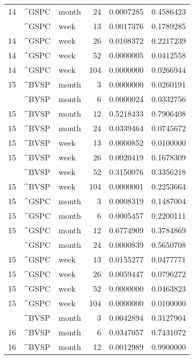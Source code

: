 \begin{tabular}{rllrrr}
14 & \textasciicircum{}GSPC & month & 24 & 0.0007285 & 0.4586423\\
\addlinespace
14 & \textasciicircum{}GSPC & week & 13 & 0.0017376 & 0.1789285\\
14 & \textasciicircum{}GSPC & week & 26 & 0.0108372 & 0.2217239\\
14 & \textasciicircum{}GSPC & week & 52 & 0.0000005 & 0.0412558\\
14 & \textasciicircum{}GSPC & week & 104 & 0.0000000 & 0.0266944\\
15 & \textasciicircum{}BVSP & month & 3 & 0.0000000 & 0.0260191\\
\addlinespace
15 & \textasciicircum{}BVSP & month & 6 & 0.0000024 & 0.0332756\\
15 & \textasciicircum{}BVSP & month & 12 & 0.5218433 & 0.7906408\\
15 & \textasciicircum{}BVSP & month & 24 & 0.0339464 & 0.0745672\\
15 & \textasciicircum{}BVSP & week & 13 & 0.0000852 & 0.0100000\\
15 & \textasciicircum{}BVSP & week & 26 & 0.0020419 & 0.1678309\\
\addlinespace
15 & \textasciicircum{}BVSP & week & 52 & 0.3150076 & 0.3356218\\
15 & \textasciicircum{}BVSP & week & 104 & 0.0000001 & 0.2253664\\
15 & \textasciicircum{}GSPC & month & 3 & 0.0008319 & 0.1487004\\
15 & \textasciicircum{}GSPC & month & 6 & 0.0005457 & 0.2200111\\
15 & \textasciicircum{}GSPC & month & 12 & 0.6774909 & 0.3784869\\
\addlinespace
15 & \textasciicircum{}GSPC & month & 24 & 0.0000839 & 0.5650708\\
15 & \textasciicircum{}GSPC & week & 13 & 0.0155277 & 0.0477771\\
15 & \textasciicircum{}GSPC & week & 26 & 0.0059447 & 0.0796272\\
15 & \textasciicircum{}GSPC & week & 52 & 0.0000000 & 0.0463823\\
15 & \textasciicircum{}GSPC & week & 104 & 0.0000000 & 0.0100000\\
\addlinespace
16 & \textasciicircum{}BVSP & month & 3 & 0.0042894 & 0.3127904\\
16 & \textasciicircum{}BVSP & month & 6 & 0.0347057 & 0.7431072\\
16 & \textasciicircum{}BVSP & month & 12 & 0.0012989 & 0.9900000\\

\end{tabular}
